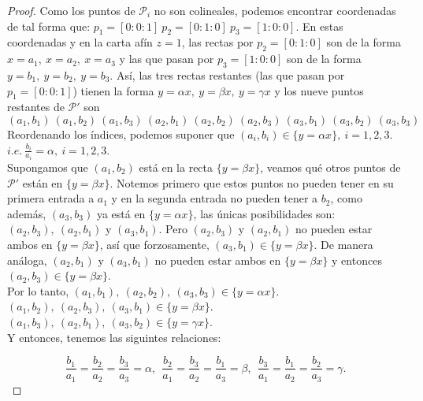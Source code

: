 \begin{proof}

Como los puntos de $\mathcal{P}_{i}$ no son colineales, podemos encontrar coordenadas de tal forma que: $p_{1} = [0:0:1]\ p_{2} = [0:1:0]\ p_{3} = [1:0:0]$. En estas coordenadas y en la carta afín $z=1$, las rectas por $p_{2} = [0:1:0]$ son de la forma $x=a_{1},\ x=a_{2},\ x=a_{3}$ y las que pasan por $p_{3} = [1:0:0]$ son de la forma $y=b_{1},\ y=b_{2},\ y=b_{3}$. Así, las tres rectas restantes (las que pasan por $p_{1} = [0:0:1]$) tienen la forma $ y = \alpha x,\ y = \beta x,\ y = \gamma x$ y los nueve puntos restantes de $\mathcal{P'}$ son $(a_{1},b_{1})\ (a_{1},b_{2})\ (a_{1},b_{3})\ (a_{2},b_{1})\ (a_{2},b_{2})\ (a_{2},b_{3})\ (a_{3},b_{1})\ (a_{3},b_{2})\ (a_{3},b_{3})\ $
\\

Reordenando los índices, podemos suponer que $(a_{i}, b_{i}) \in \{ y = \alpha x \},\ i=1,2,3$. $\mathit{i.e.}\ \frac{b_{i}}{a_{i}} = \alpha, \ i=1,2,3$.
\\

Supongamos que $(a_{1},b_{2})$ está en la recta $\{ y = \beta x\}$, veamos qué otros puntos de $\mathcal{P'}$ están en $\{ y = \beta x\}$. Notemos primero que estos puntos no pueden tener en su primera entrada a $a_{1}$ y en la segunda entrada no pueden tener a $b_{2}$, como además, $(a_{3},b_{3})$ ya está en $\{ y = \alpha x \}$, las únicas posibilidades son: $(a_{2}, b_{3}),\ (a_{2}, b_{1})$ y $(a_{3}, b_{1})$. Pero $(a_{2}, b_{3})$ y $(a_{2}, b_{1})$ no pueden estar ambos en $\{ y = \beta x\}$, así que forzosamente, $(a_{3},b_{1}) \in \{ y = \beta x\}$. De manera análoga, $(a_{2},b_{1})$ y $(a_{3},b_{1})$ no pueden estar ambos en $\{ y = \beta x\}$ y entonces $(a_{2},b_{3}) \in \{ y = \beta x\}$.
\\

\noindent Por lo tanto, $(a_{1},b_{1}),\ (a_{2},b_{2}),\ (a_{3},b_{3})\in \{ y = \alpha x\}$.
\\
$(a_{1},b_{2}),\ (a_{2},b_{3}),\ (a_{3},b_{1})\in \{ y = \beta x\}$.
\\
$(a_{1},b_{3}),\ (a_{2},b_{1}),\ (a_{3},b_{2})\in \{ y = \gamma x\}$.
\\

\noindent Y entonces, tenemos las siguintes relaciones:

$$\frac{b_{1}}{a_{1}}=\frac{b_{2}}{a_{2}}=\frac{b_{3}}{a_{3}}=\alpha,\ \ \frac{b_{2}}{a_{1}}=\frac{b_{3}}{a_{2}}=\frac{b_{1}}{a_{3}}=\beta,\ \ \frac{b_{3}}{a_{1}}=\frac{b_{1}}{a_{2}}=\frac{b_{2}}{a_{3}}=\gamma.$$


\end{proof}
